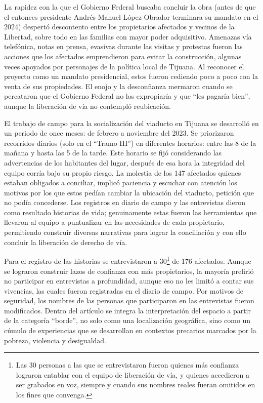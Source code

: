 \documentclass[
  spanish,
  11pt,
  a4paper,
]{scrbook}
\begin{document}
La rapidez con la que el Gobierno Federal buscaba concluir la obra
(antes de que el entonces presidente Andrés Manuel López Obrador
terminara su mandato en el 2024) despertó descontento entre los
propietarios afectados y vecinos de la Libertad, sobre todo en las
familias con mayor poder adquisitivo. Amenazas vía telefónica, notas en
prensa, evasivas durante las visitas y protestas fueron las acciones que
los afectados emprendieron para evitar la construcción, algunas veces
apoyados por personajes de la política local de Tijuana. Al reconocer el
proyecto como un mandato presidencial, estos fueron cediendo poco a poco
con la venta de sus propiedades. El enojo y la desconfianza mermaron
cuando se percataron que el Gobierno Federal no los expropiaría y que
``les pagaría bien'', aunque la liberación de vía no contempló
reubicación.

El trabajo de campo para la socialización del viaducto en Tijuana se
desarrolló en un periodo de once meses: de febrero a noviembre del 2023.
Se priorizaron recorridos diarios (solo en el ``Tramo III'') en
diferentes horarios: entre las 8 de la mañana y hasta las 5 de la tarde.
Este horario se fijó considerando las advertencias de los habitantes del
lugar, después de esa hora la integridad del equipo corría bajo su
propio riesgo. La molestia de los 147 afectados quienes estaban
obligados a conciliar, implicó paciencia y escuchar con atención los
motivos por los que estos pedían cambiar la ubicación del viaducto,
petición que no podía concederse. Los registros en diario de campo y las
entrevistas dieron como resultado historias de vida; genuinamente estas
fueron las herramientas que llevaron al equipo a puntualizar en las
necesidades de cada propietario, permitiendo construir diversas
narrativas para lograr la conciliación y con ello concluir la liberación
de derecho de vía.

Para el registro de las historias se entrevistaron a 30\footnote{Las 30
  personas a las que se entrevistaron fueron quienes más confianza
  lograron entablar con el equipo de liberación de vía, y quienes
  accedieron a ser grabados en voz, siempre y cuando sus nombres reales
  fueran omitidos en los fines que convenga.} de 176 afectados. Aunque
se lograron construir lazos de confianza con más propietarios, la
mayoría prefirió no participar en entrevistas a profundidad, aunque eso
no les limitó a contar sus vivencias, las cuales fueron registradas en
el diario de campo. Por motivos de seguridad, los nombres de las
personas que participaron en las entrevistas fueron modificados. Dentro
del artículo se integra la interpretación del espacio a partir de la
categoría ``borde'', no solo como una localización geográfica, sino como
un cúmulo de experiencias que se desarrollan en contextos precarios
marcados por la pobreza, violencia y desigualdad.
\end{document}
